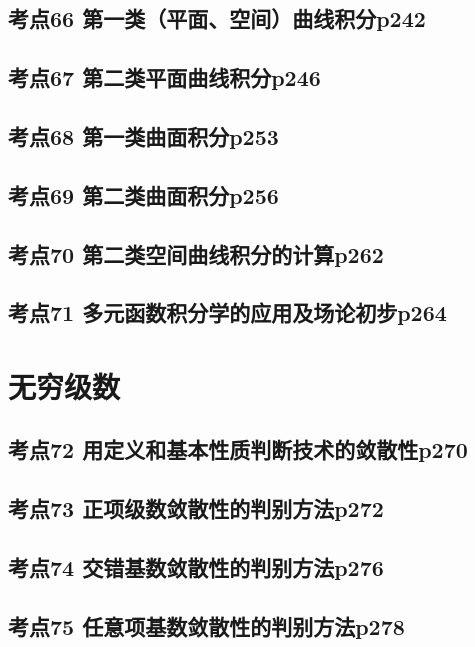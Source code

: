 \section{考点66 第一类（平面、空间）曲线积分p242}

\section{考点67 第二类平面曲线积分p246}

\section{考点68 第一类曲面积分p253}

\section{考点69 第二类曲面积分p256}

\section{考点70 第二类空间曲线积分的计算p262}

\section{考点71 多元函数积分学的应用及场论初步p264}

\chapter{无穷级数}

\section{考点72 用定义和基本性质判断技术的敛散性p270}

\section{考点73 正项级数敛散性的判别方法p272}

\section{考点74 交错基数敛散性的判别方法p276}

\section{考点75 任意项基数敛散性的判别方法p278}

